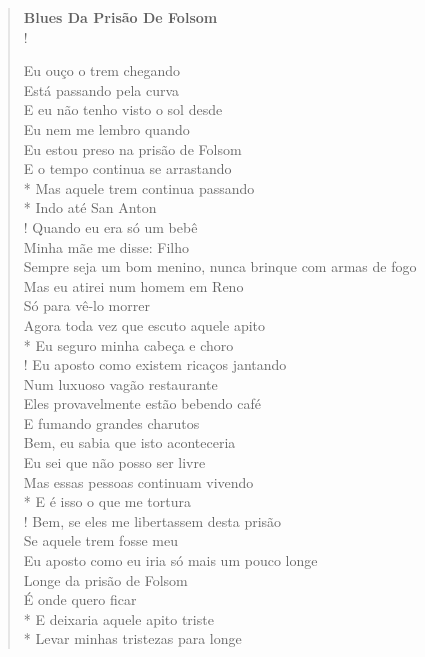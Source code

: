 \documentclass[11pt]{extarticle}
\begin{document}
\begin{verse}
\textbf{Blues Da Prisão De Folsom}\\!

Eu ouço o trem chegando\\
Está passando pela curva\\
E eu não tenho visto o sol desde\\
Eu nem me lembro quando\\
Eu estou preso na prisão de Folsom\\
E o tempo continua se arrastando\\*
Mas aquele trem continua passando\\*
Indo até San Anton\\!
Quando eu era só um bebê\\
Minha mãe me disse: Filho\\
Sempre seja um bom menino, nunca brinque com armas de fogo\\
Mas eu atirei num homem em Reno\\
Só para vê-lo morrer\\
Agora toda vez que escuto aquele apito\\*
Eu seguro minha cabeça e choro\\!
Eu aposto como existem ricaços jantando\\
Num luxuoso vagão restaurante\\
Eles provavelmente estão bebendo café\\
E fumando grandes charutos\\
Bem, eu sabia que isto aconteceria\\
Eu sei que não posso ser livre\\
Mas essas pessoas continuam vivendo\\*
E é isso o que me tortura\\!
Bem, se eles me libertassem desta prisão\\
Se aquele trem fosse meu\\
Eu aposto como eu iria só mais um pouco longe\\
Longe da prisão de Folsom\\
É onde quero ficar\\*
E deixaria aquele apito triste\\*
Levar minhas tristezas para longe
\end{verse}
\end{document}
